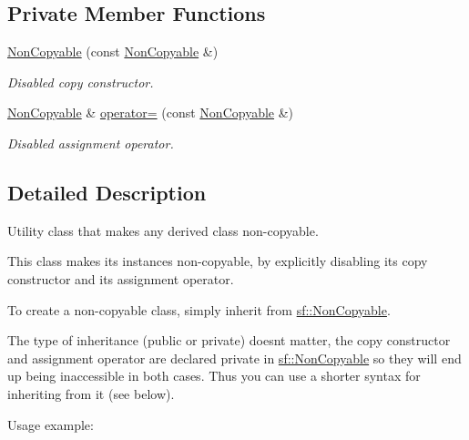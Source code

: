 \subsection*{Private Member Functions}
\begin{DoxyCompactItemize}
\item 
\mbox{\hyperlink{classsf_1_1_non_copyable_a57729c3045ce03f392ae1ba732224ddb}{Non\+Copyable}} (const \mbox{\hyperlink{classsf_1_1_non_copyable}{Non\+Copyable}} \&)
\begin{DoxyCompactList}\small\item\em Disabled copy constructor. \end{DoxyCompactList}\item 
\mbox{\hyperlink{classsf_1_1_non_copyable}{Non\+Copyable}} \& \mbox{\hyperlink{classsf_1_1_non_copyable_ab5f6914b91378d9afc74e07094fc91e4}{operator=}} (const \mbox{\hyperlink{classsf_1_1_non_copyable}{Non\+Copyable}} \&)
\begin{DoxyCompactList}\small\item\em Disabled assignment operator. \end{DoxyCompactList}\end{DoxyCompactItemize}


\subsection{Detailed Description}
Utility class that makes any derived class non-\/copyable. 

\begin{DoxyVerb}\end{DoxyVerb}


This class makes its instances non-\/copyable, by explicitly disabling its copy constructor and its assignment operator.

To create a non-\/copyable class, simply inherit from \mbox{\hyperlink{classsf_1_1_non_copyable}{sf\+::\+Non\+Copyable}}.

The type of inheritance (public or private) doesn\textquotesingle{}t matter, the copy constructor and assignment operator are declared private in \mbox{\hyperlink{classsf_1_1_non_copyable}{sf\+::\+Non\+Copyable}} so they will end up being inaccessible in both cases. Thus you can use a shorter syntax for inheriting from it (see below).

Usage example\+: 
\begin{DoxyCode}{0}
\DoxyCodeLine{\{}
\DoxyCodeLine{\};}
\end{DoxyCode}


